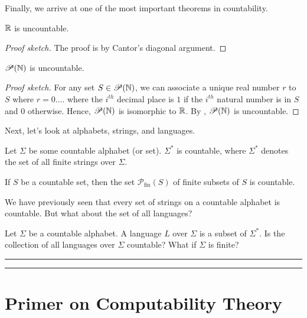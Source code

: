 \documentclass[11pt,usenames, dvipsnames]{article}
\begin{document}
Finally, we arrive at one of the most important theorems in countability.

\begin{theorem}
  $\mathbb{R}$ is uncountable.
\end{theorem}

\begin{proof}[Proof sketch]
  The proof is by Cantor's diagonal argument.
\end{proof}

\begin{theorem}
  $\mathscr{P}(\mathbb{N})$ is uncountable.
\end{theorem}

\begin{proof}[Proof sketch]
  For any set $S \in \mathscr{P}(\mathbb{N})$, we can associate a unique real number $r$ to $S$ where $r = 0.\ldots$ where the $i^{th}$ decimal place is $1$ if the $i^{th}$ natural number is in $S$ and $0$ otherwise. Hence, $\mathscr{P}(\mathbb{N})$ is isomorphic to $\mathbb{R}$. By , $\mathscr{P}(\mathbb{N})$ is uncountable.
\end{proof}

Next, let's look at alphabets, strings, and languages.

\begin{theorem}
  Let $\Sigma$ be some countable alphabet (or set). $\Sigma^*$ is countable, where $\Sigma^*$ denotes the set of all finite strings over $\Sigma$.
\end{theorem}

\begin{theorem}
  If $S$ be a countable set, then the set $\mathscr{P}_{\text{fin}}{(S)}$ of finite subsets of $S$ is countable.
\end{theorem}

We have previously seen that every set of strings on a countable alphabet is countable. But what about the set of all languages?

\begin{question}
  Let $\Sigma$ be a countable alphabet. A language $L$ over $\Sigma$ is a subset of $\Sigma^*$. Is the collection of all languages over $\Sigma$ countable? What if $\Sigma$ is finite?
\end{question}

\vspace{5truemm}
\hrule
\hrule

\section*{\large \centering Primer on Computability Theory}
\noindent
\end{document}
